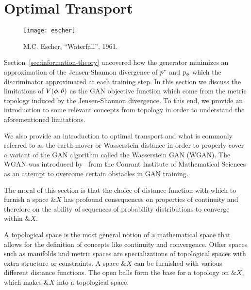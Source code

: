 \section{Optimal Transport}%
\label{sec:optimal-transport}

\vspace{1cm}

\begin{figure}[h]%
  \label{fig:paradise}
  \centering
   {
    \texttt{[image: escher]}
  }
  \caption{M.C. Escher, ``Waterfall'', 1961.}
\end{figure}

\vspace{1cm}

\noindent Section~\ref{sec:information-theory} uncovered how the generator
minimizes an approximation of the Jensen-Shannon divergence of $p^*$ and $p_{\phi}$
which the discriminator approximated at each training step. In this section we
discuss the limitations of $V(\phi, \theta)$ as the GAN objective function which come from
the metric topology induced by the Jensen-Shannon divergence. To this end, we
provide an introduction to some relevant concepts from topology in order to
understand the aforementioned limitations.

We also provide an introduction to optimal transport and what is commonly
referred to as the earth mover or Wasserstein distance in order to properly
cover a variant of the GAN algorithm called the Wasserstein GAN (WGAN). The WGAN
was introduced by~\cite{ref:arjovsky-2017} from the Courant Institute of
Mathematical Sciences as an attempt to overcome certain obstacles in GAN
training.

The moral of this section is that the choice of distance function with which to
furnish a space $\&X$ has profound consequences on properties of continuity and
therefore on the ability of sequences of probability distributions to converge
within $\&X$.


A topological space is the most general notion of a mathematical space that
allows for the definition of concepts like continuity and convergence. Other
spaces such as manifolds and metric spaces are specializations of topological
spaces with extra structure or constraints. A space $\&X$ can be furnished with
various different distance functions. The open balls form the base for a
topology on $\&X$, which makes $\&X$ into a topological space.

